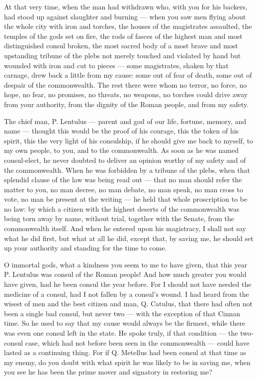  At that very time, when the man had withdrawn who, with you for his backers, had stood up against slaughter and burning --- when you saw men flying about the whole city with iron and torches, the houses of the magistrates assaulted, the temples of the gods set on fire, the rods of fasces of the highest man and most distinguished consul broken, the most sacred body of a most brave and most upstanding tribune of the plebs not merely touched and violated by hand but wounded with iron and cut to pieces --- some magistrates, shaken by that carnage, drew back a little from my cause: some out of fear of death, some out of despair of the commonwealth. The rest there were whom no terror, no force, no hope, no fear, no promises, no threats, no weapons, no torches could drive away from your authority, from the dignity of the Roman people, and from my safety.

 The chief man, P. Lentulus --- parent and god of our life, fortune, memory, and name --- thought this would be the proof of his courage, this the token of his spirit, this the very light of his consulship, if he should give me back to myself, to my own people, to you, and to the commonwealth. As soon as he was named consul-elect, he never doubted to deliver an opinion worthy of my safety and of the commonwealth. When he was forbidden by a tribune of the plebs, when that splendid clause of the law was being read out --- that no man should refer the matter to you, no man decree, no man debate, no man speak, no man cross to vote, no man be present at the writing --- he held that whole proscription to be no law: by which a citizen with the highest deserts of the commonwealth was being torn away by name, without trial, together with the Senate, from the commonwealth itself. And when he entered upon his magistracy, I shall not say what he did first, but what at all he did, except that, by saving me, he should set up your authority and standing for the time to come.

 O immortal gods, what a kindness you seem to me to have given, that this year P. Lentulus was consul of the Roman people! And how much greater you would have given, had he been consul the year before. For I should not have needed the medicine of a consul, had I not fallen by a consul's wound. I had heard from the wisest of men and the best citizen and man, Q. Catulus, that there had often not been a single bad consul, but never two --- with the exception of that Cinnan time. So he used to say that my cause would always be the firmest, while there was even one consul left in the state. He spoke truly, if that condition --- the two-consul case, which had not before been seen in the commonwealth --- could have lasted as a continuing thing. For if Q. Metellus had been consul at that time as my enemy, do you doubt with what spirit he was likely to be in saving me, when you see he has been the prime mover and signatory in restoring me?

